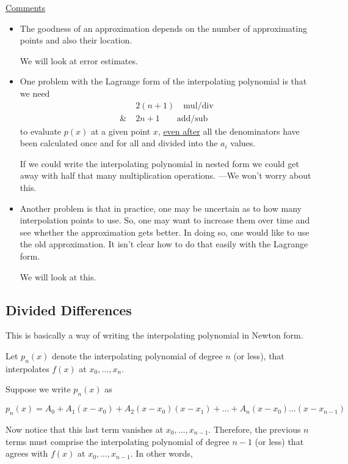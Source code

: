 \noindent \underline{Comments}
\begin{itemize}
 \renewcommand{\labelitemi}{$\qedsymbol$} 
 \item  The goodness of an approximation depends on the number of approximating points and also their location. 
 
        We will look at error estimates.
 \item One problem with the Lagrange form of the interpolating polynomial is that we need 
        \begin{align*}
                  &2(n+1) \quad \text{mul/div} \\
            \& \; &2n+1 \quad \quad \text{add/sub}
        \end{align*}
        to evaluate $p(x)$ at a given point $x$, \underline{even after} all the denominators have been calculated once and for all and divided into the $a_i$ values. 
        
        If we could write the interpolating polynomial in nested form we could get away with half that many multiplication operations. ---We won't worry about this. 
 \item Another problem is that in practice, one may be uncertain as to how many interpolation points to use. 
       So, one may want to increase them over time and see whether the approximation gets better. 
       In doing so, one would like to use the old approximation. 
       It isn't clear how to do that easily with the Lagrange form. 
       
       We will look at this. 
\end{itemize}

\subsection{Divided Differences}

This is basically a way of writing the interpolating polynomial in Newton form. 

Let $p_n(x)$ denote the interpolating polynomial of degree $n$ (or less), that interpolates $f(x)$ at $x_0, \dots, x_n$. 

Suppose we write $p_n(x)$ as

\begin{equation*}
    p_n(x) = A_0 + A_1(x-x_0) + A_2(x-x_0)(x-x_1)+ \dots + A_n(x-x_0)\dots(x-x_{n-1})
\end{equation*}

\vspace{-.4cm} 
\begin{figure}[H]
    \hspace{3.2cm}
    
    \label{fig:polynomial-2}
\end{figure}
\vspace{-.7cm} 
\noindent Now notice that this last term vanishes at $x_0, \dots, x_{n-1}$. Therefore, the previous $n$ terms must comprise the interpolating polynomial of degree $n-1$ (or less) that agrees with $f(x)$ at $x_0, \dots, x_{n-1}$. In other words, 

